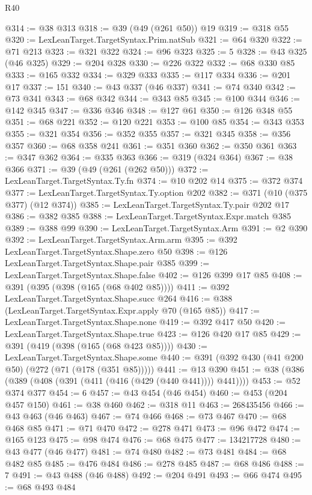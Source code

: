 \begin{lexlean}{R40}
\begin{coremodule}
@314 := @38 @313
@318 := @39 (@49 (@261 @50)) @19
@319 := @318 @55
@320 := LexLeanTarget.TargetSyntax.Prim.natSub
@321 := @64 @320
@322 := @71 @213
@323 := @321 @322
@324 := @96 @323
@325 := 5
@328 := @43 @325 (@46 @325)
@329 := @204 @328
@330 := @226 @322
@332 := @68 @330 @85
@333 := @165 @332
@334 := @329 @333
@335 := @117 @334
@336 := @201 @17
@337 := 151
@340 := @43 @337 (@46 @337)
@341 := @74 @340
@342 := @73 @341
@343 := @68 @342
@344 := @343 @85
@345 := @100 @344
@346 := @142 @345
@347 := @336 @346
@348 := @127 @61
@350 := @126 @348 @55
@351 := @68 @221
@352 := @120 @221
@353 := @100 @85
@354 := @343 @353
@355 := @321 @354
@356 := @352 @355
@357 := @321 @345
@358 := @356 @357
@360 := @68 @358 @241
@361 := @351 @360
@362 := @350 @361
@363 := @347 @362
@364 := @335 @363
@366 := @319 (@324 @364)
@367 := @38 @366
@371 := @39 (@49 (@261 (@262 @50)))
@372 := LexLeanTarget.TargetSyntax.Ty.fn
@374 := @10 @202 @14
@375 := @372 @374
@377 := LexLeanTarget.TargetSyntax.Ty.option @202
@382 := @371 (@10 (@375 @377) (@12 @374))
@385 := LexLeanTarget.TargetSyntax.Ty.pair @202 @17
@386 := @382 @385
@388 := LexLeanTarget.TargetSyntax.Expr.match @385
@389 := @388 @99
@390 := LexLeanTarget.TargetSyntax.Arm
@391 := @2 @390
@392 := LexLeanTarget.TargetSyntax.Arm.arm
@395 := @392 LexLeanTarget.TargetSyntax.Shape.zero @50
@398 := @126 LexLeanTarget.TargetSyntax.Shape.pair @385
@399 := LexLeanTarget.TargetSyntax.Shape.false
@402 := @126 @399 @17 @85
@408 := @391 (@395 (@398 (@165 (@68 @402 @85))))
@411 := @392 LexLeanTarget.TargetSyntax.Shape.succ @264
@416 := @388 (LexLeanTarget.TargetSyntax.Expr.apply @70 (@165 @85))
@417 := LexLeanTarget.TargetSyntax.Shape.none
@419 := @392 @417 @50
@420 := LexLeanTarget.TargetSyntax.Shape.true
@423 := @126 @420 @17 @85
@429 := @391 (@419 (@398 (@165 (@68 @423 @85))))
@430 := LexLeanTarget.TargetSyntax.Shape.some
@440 := @391 (@392 @430 (@41 @200 @50) (@272 (@71 (@178 (@351 @85)))))
@441 := @13 @390
@451 := @38 (@386 (@389 (@408 (@391 (@411 (@416 (@429 (@440 @441)))) @441))))
@453 := @52 @374 @377
@454 := 6
@457 := @43 @454 (@46 @454)
@460 := @453 (@204 @457 @150)
@461 := @38 @460
@462 := @318 @11
@463 := 268435456
@466 := @43 @463 (@46 @463)
@467 := @74 @466
@468 := @73 @467
@470 := @68 @468 @85
@471 := @71 @470
@472 := @278 @471
@473 := @96 @472
@474 := @165 @123
@475 := @98 @474
@476 := @68 @475
@477 := 134217728
@480 := @43 @477 (@46 @477)
@481 := @74 @480
@482 := @73 @481
@484 := @68 @482 @85
@485 := @476 @484
@486 := @278 @485
@487 := @68 @486
@488 := 7
@491 := @43 @488 (@46 @488)
@492 := @204 @491
@493 := @66 @474
@495 := @68 @493 @484

\end{coremodule}
\end{lexlean}
